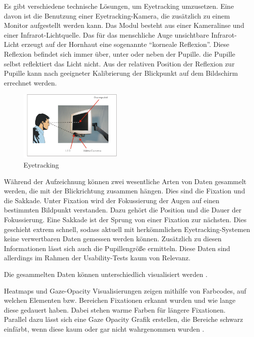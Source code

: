 Es gibt verschiedene technische Lösungen, um Eyetracking umzusetzen. Eine davon ist die Benutzung einer Eyetracking-Kamera, die zusätzlich zu einem Monitor aufgestellt werden kann. Das Modul besteht aus einer Kameralinse und einer Infrarot-Lichtquelle. Das für das menschliche Auge unsichtbare Infrarot-Licht erzeugt auf der Hornhaut eine sogenannte \enquote{korneale Reflexion}. Diese Reflexion befindet sich immer über, unter oder neben der Pupille. die Pupille selbst reflektiert das Licht nicht. Aus der relativen Position der Reflexion zur Pupille kann nach geeigneter Kalibrierung der Blickpunkt auf dem Bildschirm errechnet werden.\par
\begin{figure}[H]
 \centering
 \includegraphics[width=0.45\textwidth]{grafiken/eyegaze.png}
 \caption{Eyetracking \cite{Eyegaze}}
 \label{fig:eyetracking}
\end{figure}
Während der Aufzeichnung können zwei wesentliche Arten von Daten gesammelt werden, die mit der Blickrichtung zusammen hängen. Dies sind die Fixation und die Sakkade. Unter Fixation wird der Fokussierung der Augen auf einen bestimmten Bildpunkt verstanden. Dazu gehört die Position und die Dauer der Fokussierung. Eine Sakkade ist der Sprung von einer Fixation zur nächsten. Dies geschieht extrem schnell, sodass aktuell mit herkömmlichen Eyetracking-Systemen keine verwertbaren Daten gemessen werden können. Zusätzlich zu diesen Informationen lässt sich auch die Pupillengröße ermitteln. Diese Daten sind allerdings im Rahmen der Usability-Tests kaum von Relevanz.\par
Die gesammelten Daten können unterschiedlich visualisiert werden \cite{Henrici2010}.\par
Heatmaps und Gaze-Opacity Visualisierungen  zeigen mithilfe von Farbcodes, auf welchen Elementen bzw. Bereichen Fixationen erkannt wurden und wie lange diese gedauert haben. Dabei stehen warme Farben für längere Fixationen. Parallel dazu lässt sich eine Gaze Opacity Grafik erstellen, die Bereiche schwarz einfärbt, wenn diese kaum oder gar nicht wahrgenommen wurden \cite{Henrici2010}.
